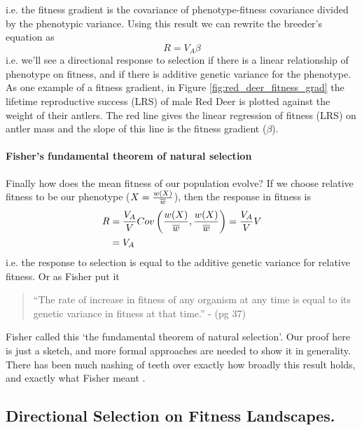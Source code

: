   i.e. the fitness gradient is the covariance of phenotype-fitness
 covariance divided by the phenotypic variance. Using this result we can rewrite the breeder's equation as
\begin{equation}
R= V_A \beta \label{eqn:R_beta}
\end{equation}
i.e. we'll see a directional response to selection if there is a linear relationship of phenotype on fitness, and if there is additive genetic variance for the phenotype. As one example of a fitness gradient, in Figure \ref{fig:red_deer_fitness_grad}  the lifetime reproductive success (LRS) of male Red Deer is plotted against the weight of their antlers. The red line gives the linear regression of fitness (LRS) on antler mass and the slope of this line is the fitness gradient ($\beta$). 


\paragraph{Fisher's fundamental theorem of natural selection} 
Finally how does the mean fitness of our population evolve? 
If we choose relative fitness to be our phenotype
  ($X=\frac{w(X)}{\overline{w}}$), then the response in fitness is
\begin{align}
  R &= \frac{V_A}{V}  Cov \left(\frac{w(X)}{\overline{w}} ,
  \frac{w(X)}{\overline{w}} \right) = \frac{V_A}{V} V \nonumber\\
  &=V_A
\end{align}
i.e. the response to selection is equal to the additive genetic
variance for relative fitness. Or as Fisher put it
\begin{quote}
``The rate of increase in fitness of any organism at any time is equal
to its genetic variance in fitness at that time.'' -\citet{fisher1930} (pg 37)
\end{quote}
Fisher called this `the fundamental theorem of natural
selection'. Our proof here is just a sketch, and more formal
approaches are needed to show it in generality. There has been much nashing of teeth over exactly how broadly this result holds, and exactly what
Fisher meant \citep[see ][ for a recent overview]{ewens2010gene}. 

\subsection{Directional Selection on Fitness Landscapes.}  \label{section:pheno_fitness_landscapes}

